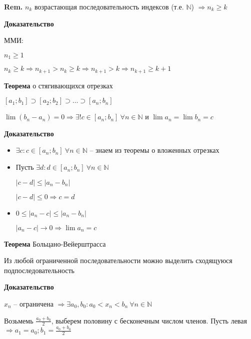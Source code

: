 \documentclass[14pt, letter paper]{article}
\begin{document}
\textbf{Rem.} $n_k$ возрастающая последовательность индексов (т.е. $\mathds{N}$) $\Rightarrow n_k \geq k$

\begin{center}
    \textbf{Доказательство}
\end{center}

ММИ: 

$n_1 \geq 1$

$n_k \geq k \Rightarrow n_{k+1} > n_k \geq k \Rightarrow n_{k+1} > k \Rightarrow n_{k+1} \geq k + 1$

\textbf{Теорема} о стягивающихся отрезках

$[a_1;b_1] \supset [a_2;b_2] \supset \ldots \supset [a_n;b_n]$

$\lim(b_n-a_n) = 0 \Rightarrow \exists! c \in [a_n;b_n]\ \forall n \in \mathds{N}$ и $\lim{a_n} = \lim{b_n} = c$

\begin{center}
    \textbf{Доказательство}
\end{center}

\begin{itemize}
    \item $\exists c : c \in [a_n;b_n]\ \forall n \in \mathds{N}$ -- знаем из теоремы о вложенных отрезках

    \item Пусть $\exists d : d \in [a_n;b_n]\ \forall n \in \mathds{N}$

    $|c-d| \leq |a_n-b_n|$

    $|c-d| \leq 0 \Rightarrow c = d$

    \item $0 \leq |a_n - c| \leq |a_n - b_n|$

    $|a_n - c| \rightarrow 0 \Rightarrow \lim{a_n} = c$
\end{itemize}

\textbf{Теорема} Больцано-Вейерштрасса

Из любой ограниченной последовательности можно выделить сходящуюся подпоследовательность

\begin{center}
    \textbf{Доказательство}
\end{center}

$x_n$ -- ограничена $\Rightarrow \exists a_0, b_0 : a_0 < x_n < b_n\ \forall n \in \mathds{N}$

Возьмемь $\frac{a_0 + b_0}{2}$, выберем половину с бесконечным числом членов. Пусть левая $\Rightarrow a_1 = a_0; b_1 = \frac{a_0 + b_0}{2}$
\end{document}
